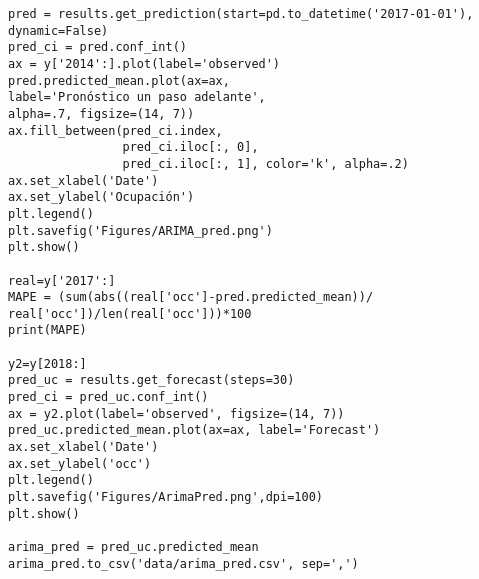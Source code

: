 \begin{verbatim}
pred = results.get_prediction(start=pd.to_datetime('2017-01-01'), dynamic=False)
pred_ci = pred.conf_int()
ax = y['2014':].plot(label='observed')
pred.predicted_mean.plot(ax=ax, 
label='Pronóstico un paso adelante', 
alpha=.7, figsize=(14, 7))
ax.fill_between(pred_ci.index,
                pred_ci.iloc[:, 0],
                pred_ci.iloc[:, 1], color='k', alpha=.2)
ax.set_xlabel('Date')
ax.set_ylabel('Ocupación')
plt.legend()
plt.savefig('Figures/ARIMA_pred.png')
plt.show()

real=y['2017':]
MAPE = (sum(abs((real['occ']-pred.predicted_mean))/
real['occ'])/len(real['occ']))*100
print(MAPE)

y2=y[2018:]
pred_uc = results.get_forecast(steps=30)
pred_ci = pred_uc.conf_int()
ax = y2.plot(label='observed', figsize=(14, 7))
pred_uc.predicted_mean.plot(ax=ax, label='Forecast')
ax.set_xlabel('Date')
ax.set_ylabel('occ')
plt.legend()
plt.savefig('Figures/ArimaPred.png',dpi=100)
plt.show()

arima_pred = pred_uc.predicted_mean
arima_pred.to_csv('data/arima_pred.csv', sep=',')








\end{verbatim}
